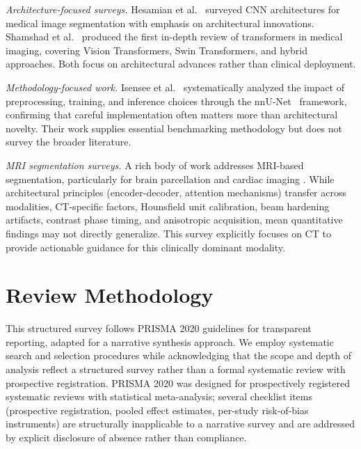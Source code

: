 \documentclass[conference]{IEEEtran}
\begin{document}
\emph{Architecture-focused surveys.} Hesamian et al.\ \cite{hesamian2019deep} surveyed CNN architectures for medical image segmentation with emphasis on architectural innovations. Shamshad et al.\ \cite{shamshad2023transformers} produced the first in-depth review of transformers in medical imaging, covering Vision Transformers, Swin Transformers, and hybrid approaches. Both focus on architectural advances rather than clinical deployment.

\emph{Methodology-focused work.} Isensee et al.\ \cite{isensee2021nnunet} systematically analyzed the impact of preprocessing, training, and inference choices through the nnU-Net~\cite{isensee2021nnunet} framework, confirming that careful implementation often matters more than architectural novelty. Their work supplies essential benchmarking methodology but does not survey the broader literature.

\emph{MRI segmentation surveys.} A rich body of work addresses MRI-based segmentation, particularly for brain parcellation \cite{fischl2012freesurfer} and cardiac imaging \cite{chen2020cardiac}. While architectural principles (encoder-decoder, attention mechanisms) transfer across modalities, CT-specific factors, Hounsfield unit calibration, beam hardening artifacts, contrast phase timing, and anisotropic acquisition, mean quantitative findings may not directly generalize. This survey explicitly focuses on CT to provide actionable guidance for this clinically dominant modality.

\section{Review Methodology}
\label{sec:methodology}

This structured survey follows PRISMA 2020 guidelines \cite{page2021prisma} for transparent reporting, adapted for a narrative synthesis approach. We employ systematic search and selection procedures while acknowledging that the scope and depth of analysis reflect a structured survey rather than a formal systematic review with prospective registration. PRISMA 2020 was designed for prospectively registered systematic reviews with statistical meta-analysis; several checklist items (prospective registration, pooled effect estimates, per-study risk-of-bias instruments) are structurally inapplicable to a narrative survey and are addressed by explicit disclosure of absence rather than compliance.
\end{document}
